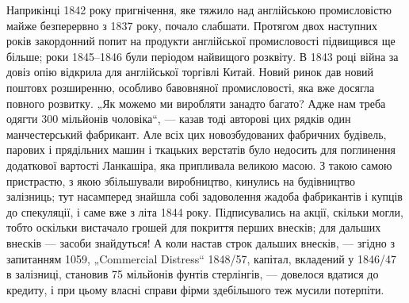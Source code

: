 Наприкінці 1842 року пригнічення, яке тяжило над англійською промисловістю майже безперервно з 1837
року, почало
слабшати. Протягом двох наступних років закордонний попит
на продукти англійської промисловості підвищився ще більше;
роки 1845--1846 були періодом найвищого розквіту. В 1843 році
війна за довіз опію відкрила для англійської торгівлі Китай. Новий
ринок дав новий поштовх розширенню, особливо бавовняної
промисловості, яка вже досягла повного розвитку. „Як можемо
ми виробляти занадто багато? Адже нам треба одягти 300 мільйонів чоловіка“, — казав тоді авторові
цих рядків один манчестерський фабрикант. Але всіх цих новозбудованих фабричних
будівель, парових і прядільних машин і ткацьких верстатів було
недосить для поглинення додаткової вартості Ланкашіра, яка
припливала великою масою. З такою самою пристрастю, з якою
збільшували виробництво, кинулись на будівництво залізниць;
тут насамперед знайшла собі задоволення жадоба фабрикантів і
купців до спекуляції, і саме вже з літа 1844 року. Підписувались на акції, скільки могли, тобто
оскільки вистачало грошей для покриття перших внесків; для дальших внесків — засоби знайдуться! А
коли настав строк дальших внесків, — згідно
з запитанням 1059, „Commercial Distress“ 1848/57, капітал, вкладений у 1846/47~ в залізниці,
становив 75 мільйонів фунтів
стерлінгів, — довелося вдатися до кредиту, і при цьому власні
справи фірми здебільшого теж мусили потерпіти.
